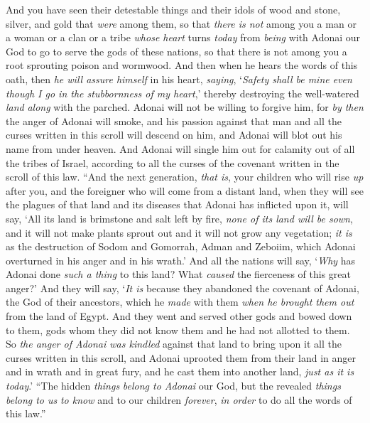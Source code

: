\begin{biblechapter}
\verse And you have seen their detestable things and their idols of wood and stone, silver, and gold that \textit{were} among them,
\verse so that \textit{there is not} among you a man or a woman or a clan or a tribe \textit{whose heart} turns \textit{today} from \textit{being} with Adonai our God to go to serve the gods of these nations, so that there is not among you a root sprouting poison and wormwood.
\verse And then when he hears the words of this oath, then \textit{he will assure himself} in his heart, \textit{saying}, ‘\textit{Safety shall be mine even though I go in the stubbornness of my heart},’ thereby destroying the well-watered \textit{land} \textit{along} with the parched.
\verse Adonai will not be willing to forgive him, for \textit{by then} the anger of Adonai will smoke, and his passion against that man and all the curses written in this scroll will descend on him, and Adonai will blot out his name from under heaven.
\verse And Adonai will single him out for calamity out of all the tribes of Israel, according to all the curses of the covenant written in the scroll of this law.
\verse “And the next generation, \textit{that is}, your children who will rise \textit{up} after you, and the foreigner who will come from a distant land, when they will see the plagues of that land and its diseases that Adonai has inflicted upon it, will say,
\verse ‘All its land is brimstone and salt left by fire, \textit{none of its land will be sown}, and it will not make plants sprout out and it will not grow any vegetation; \textit{it is} as the destruction of Sodom and Gomorrah, Adman and Zeboiim, which Adonai overturned in his anger and in his wrath.’
\verse And all the nations will say, ‘\textit{Why} has Adonai done \textit{such a thing} to this land? What \textit{caused} the fierceness of this great anger?’
\verse And they will say, ‘\textit{It is} because they abandoned the covenant of Adonai, the God of their ancestors, which he \textit{made} with them \textit{when he brought them out} from the land of Egypt.
\verse And they went and served other gods and bowed down to them, gods whom they did not know them and he had not allotted to them.
\verse So \textit{the anger of Adonai was kindled} against that land to bring upon it all the curses written in this scroll,
\verse and Adonai uprooted them from their land in anger and in wrath and in great fury, and he cast them into another land, \textit{just as it is today}.’
\verse “The hidden \textit{things} \textit{belong to Adonai} our God, but the revealed \textit{things} \textit{belong to us} \textit{to know} and to our children \textit{forever}, \textit{in order} to do all the words of this law.”
\end{biblechapter}

